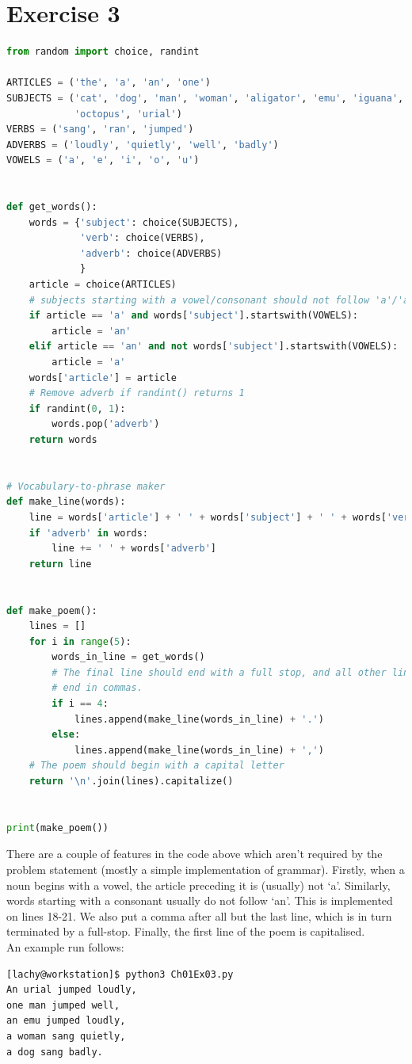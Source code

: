 \documentclass{report}
\begin{document}
\section*{Exercise 3}
\begin{lstlisting}[language=Python, style=pythonStyle]
from random import choice, randint

ARTICLES = ('the', 'a', 'an', 'one')
SUBJECTS = ('cat', 'dog', 'man', 'woman', 'aligator', 'emu', 'iguana', 
            'octopus', 'urial')
VERBS = ('sang', 'ran', 'jumped')
ADVERBS = ('loudly', 'quietly', 'well', 'badly')
VOWELS = ('a', 'e', 'i', 'o', 'u')


def get_words():
    words = {'subject': choice(SUBJECTS),
             'verb': choice(VERBS),
             'adverb': choice(ADVERBS)
             }
    article = choice(ARTICLES)
    # subjects starting with a vowel/consonant should not follow 'a'/'an'
    if article == 'a' and words['subject'].startswith(VOWELS):
        article = 'an'
    elif article == 'an' and not words['subject'].startswith(VOWELS):
        article = 'a'
    words['article'] = article
    # Remove adverb if randint() returns 1
    if randint(0, 1):
        words.pop('adverb')
    return words


# Vocabulary-to-phrase maker
def make_line(words):
    line = words['article'] + ' ' + words['subject'] + ' ' + words['verb']
    if 'adverb' in words:
        line += ' ' + words['adverb']
    return line


def make_poem():
    lines = []
    for i in range(5):
        words_in_line = get_words()
        # The final line should end with a full stop, and all other lines
        # end in commas.
        if i == 4:
            lines.append(make_line(words_in_line) + '.')
        else:
            lines.append(make_line(words_in_line) + ',')
    # The poem should begin with a capital letter
    return '\n'.join(lines).capitalize()


print(make_poem())
\end{lstlisting}
There are a couple of features in the code above which aren't required by the problem statement (mostly a simple implementation of grammar). Firstly, when a noun begins with a vowel, the article preceding it is (usually) not `a'. Similarly, words starting with a consonant usually do not follow `an'. This is implemented on lines 18-21. We also put a comma after all but the last line, which is in turn terminated by a full-stop. Finally, the first line of the poem is capitalised.\\
\indent An example run follows:
\begin{lstlisting}[language=bash, style=terminalStyle]
[lachy@workstation]$ python3 Ch01Ex03.py 
An urial jumped loudly,
one man jumped well,
an emu jumped loudly,
a woman sang quietly,
a dog sang badly.
\end{lstlisting}
\newpage
\end{document}
